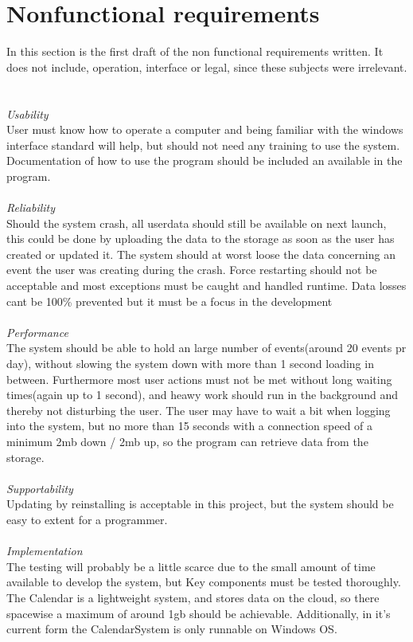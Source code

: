 \section{Nonfunctional requirements}

In this section is the first draft of the non functional requirements written. It does not include, operation, interface or legal, since these subjects were irrelevant.
\\ 
\\
\HRule \\[0.4cm]
\emph{Usability} \\ 
User must know how to operate a computer and being familiar with the windows interface standard will help, but should not need any training to use the system. Documentation of how to use the program should be included an available in the program. \\
\HRule \\[0.4cm]
\emph{Reliability} \\
Should the system crash, all userdata should still be available on next launch, this could be done by uploading the data to the storage as soon as the user has created or updated it. The system should at worst loose the data concerning an event the user was creating during the crash. Force restarting should not be acceptable and most exceptions must be caught and handled runtime. Data losses cant be 100\% prevented but it must be a focus in the development\\
\HRule \\[0.4cm]
\emph{Performance} \\
The system should be able to hold an large number of events(around 20 events pr day), without slowing the system down with more than 1 second loading in between. Furthermore most user actions must not be met without long waiting times(again up to 1 second), and heawy work should run in the background and thereby not disturbing the user.  The user may have to wait a bit when logging into the system, but no more than 15 seconds with a connection speed of a minimum 2mb down / 2mb up, so the program can retrieve data from the storage. \\
\HRule \\[0.4cm]
\emph{Supportability} \\
Updating by reinstalling is acceptable in this project, but the system should be easy to extent for a programmer.\\
\HRule \\[0.4cm]
\emph{Implementation}\\
The testing will probably be a little scarce due to the small amount of time available to develop the system, but Key components must be tested thoroughly.  The Calendar is a lightweight system, and stores data on the cloud, so there spacewise a maximum of around 1gb should be achievable. Additionally, in it's current form the CalendarSystem is only runnable on Windows OS.\\
\HRule \\[0.4cm]

\newpage